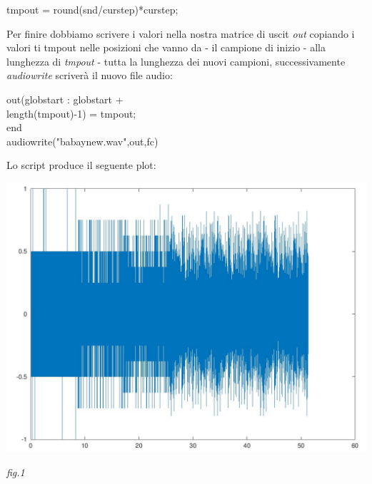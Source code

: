 \documentclass[11pt]{article}
\begin{document}
\begin{multicols*}{2}
\begin{center}
\begin{minipage}[c]{6.8cm}
\begin{sffamily}
tmpout = round(snd/curstep)*curstep;\\

\end{sffamily}
\end{minipage}
\end{center}

Per finire dobbiamo scrivere i valori nella nostra matrice di uscit \textit {out} copiando i valori ti tmpout nelle posizioni che vanno da  - il campione di inizio - alla lunghezza di \textit{tmpout} - tutta la lunghezza dei nuovi campioni, successivamente \textit {audiowrite} scriverà il nuovo file audio:

\begin{center}
\begin{minipage}[c]{6.8cm}
\begin{sffamily}

out(globstart : globstart + \\
length(tmpout)-1) = tmpout;\\
end\\
audiowrite("babaynew.wav",out,fc)\\

\end{sffamily}
\end{minipage}
\end{center}

Lo script produce il seguente plot:

\begin{center}
\includegraphics[scale=0.4]{images/plot01.png}

{\scriptsize \emph{fig.1 }}
\end{center}


\end{multicols*}
\end{document}
